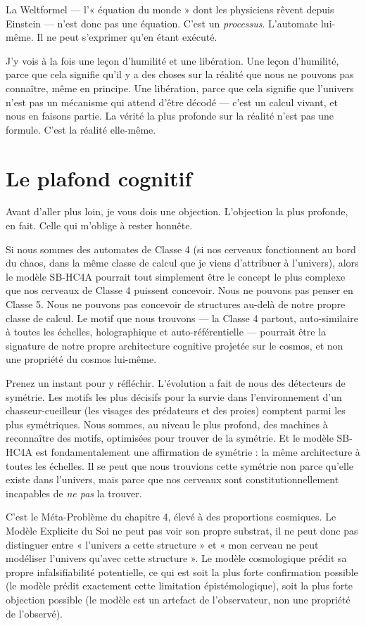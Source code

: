 \documentclass[11pt, twoside, openright]{book}
\begin{document}
La Weltformel --- l'« équation du monde » dont les physiciens rêvent depuis Einstein --- n'est donc pas une équation. C'est un \textit{processus}. L'automate lui-même. Il ne peut s'exprimer qu'en étant exécuté.

J'y vois à la fois une leçon d'humilité et une libération. Une leçon d'humilité, parce que cela signifie qu'il y a des choses sur la réalité que nous ne pouvons pas connaître, même en principe. Une libération, parce que cela signifie que l'univers n'est pas un mécanisme qui attend d'être décodé --- c'est un calcul vivant, et nous en faisons partie. La vérité la plus profonde sur la réalité n'est pas une formule. C'est la réalité elle-même.


\section*{Le plafond cognitif}

Avant d'aller plus loin, je vous dois une objection. L'objection la plus profonde, en fait. Celle qui m'oblige à rester honnête.

Si nous sommes des automates de Classe 4 (si nos cerveaux fonctionnent au bord du chaos, dans la même classe de calcul que je viens d'attribuer à l'univers), alors le modèle SB-HC4A pourrait tout simplement être le concept le plus complexe que nos cerveaux de Classe 4 puissent concevoir. Nous ne pouvons pas penser en Classe 5. Nous ne pouvons pas concevoir de structures au-delà de notre propre classe de calcul. Le motif que nous trouvons --- la Classe 4 partout, auto-similaire à toutes les échelles, holographique et auto-référentielle --- pourrait être la signature de notre propre architecture cognitive projetée sur le cosmos, et non une propriété du cosmos lui-même.

Prenez un instant pour y réfléchir. L'évolution a fait de nous des détecteurs de symétrie. Les motifs les plus décisifs pour la survie dans l'environnement d'un chasseur-cueilleur (les visages des prédateurs et des proies) comptent parmi les plus symétriques. Nous sommes, au niveau le plus profond, des machines à reconnaître des motifs, optimisées pour trouver de la symétrie. Et le modèle SB-HC4A est fondamentalement une affirmation de symétrie : la même architecture à toutes les échelles. Il se peut que nous trouvions cette symétrie non parce qu'elle existe dans l'univers, mais parce que nos cerveaux sont constitutionnellement incapables de \textit{ne pas} la trouver.

C'est le Méta-Problème du chapitre 4, élevé à des proportions cosmiques. Le Modèle Explicite du Soi ne peut pas voir son propre substrat, il ne peut donc pas distinguer entre « l'univers a cette structure » et « mon cerveau ne peut modéliser l'univers qu'avec cette structure ». Le modèle cosmologique prédit sa propre infalsifiabilité potentielle, ce qui est soit la plus forte confirmation possible (le modèle prédit exactement cette limitation épistémologique), soit la plus forte objection possible (le modèle est un artefact de l'observateur, non une propriété de l'observé).
\end{document}
